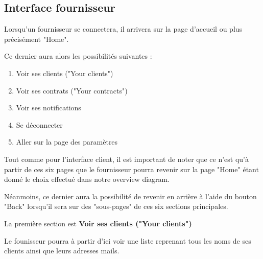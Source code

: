 \newpage
\subsection{Interface fournisseur}

Lorsqu'un fournisseur se connectera, il arrivera sur la page d'accueil ou plus précisément "Home".
\begin{flushleft}
Ce dernier aura alors les possibilités suivantes :
\end{flushleft}
\begin{enumerate}
\item Voir ses clients ("Your clients")
\item Voir ses contrats ("Your contracts")
\item Voir ses notifications
\item Se déconnecter
\item Aller sur la page des paramètres
\end{enumerate}

\begin{flushleft}
Tout comme pour l'interface client, il est important de noter que ce n'est qu'à partir de ces six pages que le fournisseur pourra revenir sur la page "Home" étant donné le choix effectué dans notre overview diagram.
\end{flushleft}

\begin{flushleft}
Néanmoins, ce dernier aura la possibilité de revenir en arrière à l'aide du bouton "Back" lorsqu'il sera sur des "sous-pages" de ces six sections principales.
\end{flushleft}

\newpage

\begin{flushleft}
La première section est \textbf{Voir ses clients ("Your clients")}
\end{flushleft}

\begin{flushleft}
Le founisseur pourra à partir d'ici voir une liste reprenant tous les noms de ses clients ainsi que leurs adresses mails. 
\end{flushleft}

